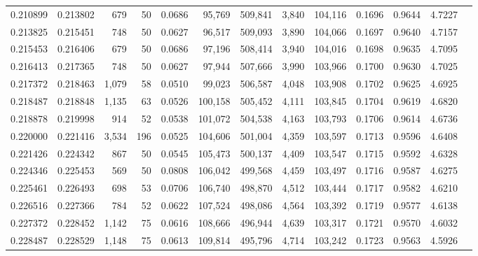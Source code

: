 \begin{tabular}{rrrrrrrrrrrrr}
0.210899 & 0.213802 &   679 &  50 &                                     0.0686 &  95,769 & 509,841 &   3,840 & 104,116 & 0.1696 & 0.9644 & 4.7227 \\
0.213825 & 0.215451 &   748 &  50 &                                     0.0627 &  96,517 & 509,093 &   3,890 & 104,066 & 0.1697 & 0.9640 & 4.7157 \\
0.215453 & 0.216406 &   679 &  50 &                                     0.0686 &  97,196 & 508,414 &   3,940 & 104,016 & 0.1698 & 0.9635 & 4.7095 \\
0.216413 & 0.217365 &   748 &  50 &                                     0.0627 &  97,944 & 507,666 &   3,990 & 103,966 & 0.1700 & 0.9630 & 4.7025 \\
0.217372 & 0.218463 & 1,079 &  58 &                                     0.0510 &  99,023 & 506,587 &   4,048 & 103,908 & 0.1702 & 0.9625 & 4.6925 \\
0.218487 & 0.218848 & 1,135 &  63 &                                     0.0526 & 100,158 & 505,452 &   4,111 & 103,845 & 0.1704 & 0.9619 & 4.6820 \\
0.218878 & 0.219998 &   914 &  52 &                                     0.0538 & 101,072 & 504,538 &   4,163 & 103,793 & 0.1706 & 0.9614 & 4.6736 \\
0.220000 & 0.221416 & 3,534 & 196 &                                     0.0525 & 104,606 & 501,004 &   4,359 & 103,597 & 0.1713 & 0.9596 & 4.6408 \\
0.221426 & 0.224342 &   867 &  50 &                                     0.0545 & 105,473 & 500,137 &   4,409 & 103,547 & 0.1715 & 0.9592 & 4.6328 \\
0.224346 & 0.225453 &   569 &  50 &                                     0.0808 & 106,042 & 499,568 &   4,459 & 103,497 & 0.1716 & 0.9587 & 4.6275 \\
0.225461 & 0.226493 &   698 &  53 &                                     0.0706 & 106,740 & 498,870 &   4,512 & 103,444 & 0.1717 & 0.9582 & 4.6210 \\
0.226516 & 0.227366 &   784 &  52 &                                     0.0622 & 107,524 & 498,086 &   4,564 & 103,392 & 0.1719 & 0.9577 & 4.6138 \\
0.227372 & 0.228452 & 1,142 &  75 &                                     0.0616 & 108,666 & 496,944 &   4,639 & 103,317 & 0.1721 & 0.9570 & 4.6032 \\
0.228487 & 0.228529 & 1,148 &  75 &                                     0.0613 & 109,814 & 495,796 &   4,714 & 103,242 & 0.1723 & 0.9563 & 4.5926 \\

\end{tabular}
